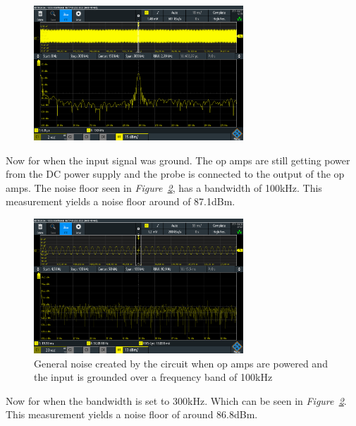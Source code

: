 \begin{figure}[h]
    \centering
    \includegraphics[width=0.7\textwidth]{graphics/FFTGenerator150k_Ac1x1.PNG}
    \caption{}
    \label{fig:FFTGene100}
\end{figure}






Now for when the input signal was ground.
The op amps are still getting power from the DC power supply and the probe is connected to the output of the op amps.
The noise floor seen in \textit{Figure~\ref{fig:noisefloor100k}}, has a bandwidth of 100kHz.
This measurement yields a noise floor around of 87.1dBm.


\begin{figure}[h]
    \centering
    \includegraphics[width=0.7\textwidth]{graphics/NoiseFloor100k.PNG}
    \caption{General noise created by the circuit when op amps are powered and the input is grounded over a frequency band of 100kHz}
    \label{fig:noisefloor100k}
\end{figure}

Now for when the bandwidth is set to 300kHz.
Which can be seen in \textit{Figure~\ref{fig:noisefloor100k}}.
This measurement yields a noise floor of around 86.8dBm.

